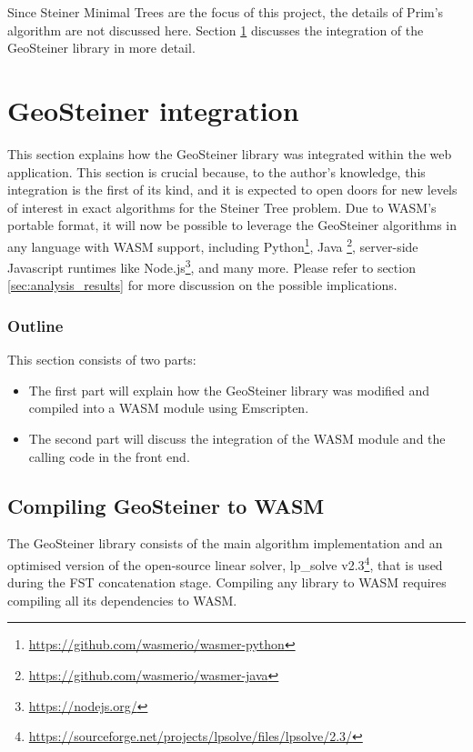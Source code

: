 \documentclass{l4proj}
\begin{document}
Since Steiner Minimal Trees are the focus of this project, the details of Prim's algorithm are not discussed here. Section \ref{sec:geosteiner_integration} discusses the integration of the GeoSteiner library in more detail.

\section{GeoSteiner integration}
\label{sec:geosteiner_integration}
This section explains how the GeoSteiner library was integrated within the web application. This section is crucial because, to the author's knowledge, this integration is the first of its kind, and it is expected to open doors for new levels of interest in exact algorithms for the Steiner Tree problem. Due to WASM's portable format, it will now be possible to leverage the GeoSteiner algorithms in any language with WASM support, including Python\footnote{\url{https://github.com/wasmerio/wasmer-python}}, Java \footnote{\url{https://github.com/wasmerio/wasmer-java}}, server-side Javascript runtimes like Node.js\footnote{\url{https://nodejs.org/}}, and many more. Please refer to section \ref{sec:analysis_results} for more discussion on the possible implications.

\subsubsection{Outline}
This section consists of two parts:
\begin{itemize}
    \item The first part will explain how the GeoSteiner library was modified and compiled into a WASM module using Emscripten.
    \item The second part will discuss the integration of the WASM module and the calling code in the front end.
\end{itemize}

\subsection{Compiling GeoSteiner to WASM}

The GeoSteiner library consists of the main algorithm implementation and an optimised version of the open-source linear solver, lp\_solve v2.3\footnote{\url{https://sourceforge.net/projects/lpsolve/files/lpsolve/2.3/}}, that is used during the FST concatenation stage.
Compiling any library to WASM requires compiling all its dependencies to WASM.
\end{document}
